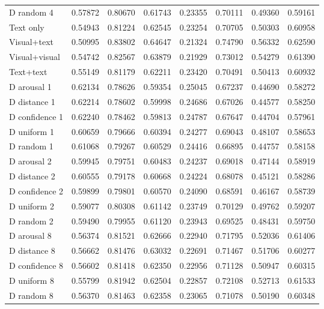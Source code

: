 \begin{longtable}{lrrrrrrr}
D random 4 & 0.57872 & 0.80670 & 0.61743 & 0.23355 & 0.70111 & 0.49360 & 0.59161\\
Text only & 0.54943 & 0.81224 & 0.62545 & 0.23254 & 0.70705 & 0.50303 & 0.60958\\
Visual+text & 0.50995 & 0.83802 & 0.64647 & 0.21324 & 0.74790 & 0.56332 & 0.62590\\
Visual+visual & 0.54742 & 0.82567 & 0.63879 & 0.21929 & 0.73012 & 0.54279 & 0.61390\\
Text+text & 0.55149 & 0.81179 & 0.62211 & 0.23420 & 0.70491 & 0.50413 & 0.60932\\
D arousal 1 & 0.62134 & 0.78626 & 0.59354 & 0.25045 & 0.67237 & 0.44690 & 0.58272\\
D distance 1 & 0.62214 & 0.78602 & 0.59998 & 0.24686 & 0.67026 & 0.44577 & 0.58250\\
D confidence 1 & 0.62240 & 0.78462 & 0.59813 & 0.24787 & 0.67647 & 0.44704 & 0.57961\\
D uniform 1 & 0.60659 & 0.79666 & 0.60394 & 0.24277 & 0.69043 & 0.48107 & 0.58653\\
D random 1 & 0.61068 & 0.79267 & 0.60529 & 0.24416 & 0.66895 & 0.44757 & 0.58158\\
D arousal 2 & 0.59945 & 0.79751 & 0.60483 & 0.24237 & 0.69018 & 0.47144 & 0.58919\\
D distance 2 & 0.60555 & 0.79178 & 0.60668 & 0.24224 & 0.68078 & 0.45121 & 0.58286\\
D confidence 2 & 0.59899 & 0.79801 & 0.60570 & 0.24090 & 0.68591 & 0.46167 & 0.58739\\
D uniform 2 & 0.59077 & 0.80308 & 0.61142 & 0.23749 & 0.70129 & 0.49762 & 0.59207\\
D random 2 & 0.59490 & 0.79955 & 0.61120 & 0.23943 & 0.69525 & 0.48431 & 0.59750\\
D arousal 8 & 0.56374 & 0.81521 & 0.62666 & 0.22940 & 0.71795 & 0.52036 & 0.61406\\
D distance 8 & 0.56662 & 0.81476 & 0.63032 & 0.22691 & 0.71467 & 0.51706 & 0.60277\\
D confidence 8 & 0.56602 & 0.81418 & 0.62350 & 0.22956 & 0.71128 & 0.50947 & 0.60315\\
D uniform 8 & 0.55799 & 0.81942 & 0.62504 & 0.22857 & 0.72108 & 0.52713 & 0.61533\\
D random 8 & 0.56370 & 0.81463 & 0.62358 & 0.23065 & 0.71078 & 0.50190 & 0.60348\\
\bottomrule\end{longtable}\endgroup

